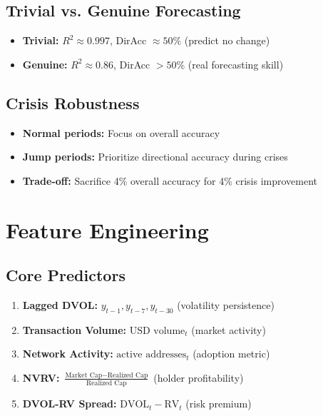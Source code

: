 \documentclass{article}
\begin{document}
\subsection{Trivial vs. Genuine Forecasting}
\begin{itemize}
\item \textbf{Trivial:} $R^2 \approx 0.997$, DirAcc $\approx 50\%$ (predict no change)
\item \textbf{Genuine:} $R^2 \approx 0.86$, DirAcc $> 50\%$ (real forecasting skill)
\end{itemize}

\subsection{Crisis Robustness}
\begin{itemize}
\item \textbf{Normal periods:} Focus on overall accuracy
\item \textbf{Jump periods:} Prioritize directional accuracy during crises
\item \textbf{Trade-off:} Sacrifice 4\% overall accuracy for 4\% crisis improvement
\end{itemize}

\section{Feature Engineering}

\subsection{Core Predictors}
\begin{enumerate}
\item \textbf{Lagged DVOL:} $y_{t-1}, y_{t-7}, y_{t-30}$ (volatility persistence)
\item \textbf{Transaction Volume:} $\text{USD volume}_t$ (market activity)
\item \textbf{Network Activity:} $\text{active addresses}_t$ (adoption metric)
\item \textbf{NVRV:} $\frac{\text{Market Cap} - \text{Realized Cap}}{\text{Realized Cap}}$ (holder profitability)
\item \textbf{DVOL-RV Spread:} $\text{DVOL}_t - \text{RV}_t$ (risk premium)
\end{enumerate}
\end{document}
